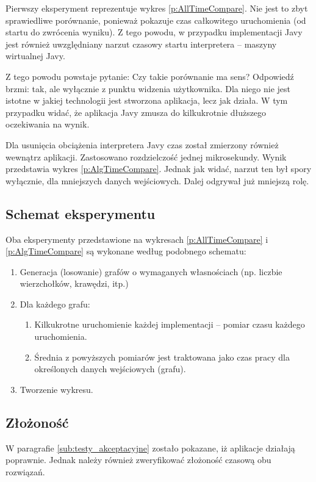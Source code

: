 Pierwszy eksperyment reprezentuje wykres \ref{p:AllTimeCompare}.
Nie jest to zbyt sprawiedliwe porównanie, ponieważ pokazuje czas całkowitego uruchomienia (od startu do zwrócenia wyniku).
Z tego powodu, w przypadku implementacji Javy jest również uwzględniany narzut czasowy startu interpretera -- maszyny wirtualnej Javy.

Z tego powodu powstaje pytanie: Czy takie porównanie ma sens? Odpowiedź brzmi: tak, ale wyłącznie z punktu widzenia użytkownika.
Dla niego nie jest istotne w jakiej technologii jest stworzona aplikacja, lecz jak działa.
W tym przypadku widać, że aplikacja Javy zmusza do kilkukrotnie dłuższego oczekiwania na wynik.

Dla usunięcia obciążenia interpretera Javy czas został zmierzony również wewnątrz aplikacji.
Zastosowano rozdzielczość jednej mikrosekundy. 
Wynik przedstawia wykres \ref{p:AlgTimeCompare}.
Jednak jak widać, narzut ten był spory wyłącznie, dla mniejszych danych wejściowych.
Dalej odgrywał już mniejszą rolę.

\subsection{Schemat eksperymentu}

Oba eksperymenty przedstawione na wykresach \ref{p:AllTimeCompare} i \ref{p:AlgTimeCompare}
są wykonane według podobnego schematu:

\begin{enumerate}
\item Generacja (losowanie) grafów o wymaganych własnościach (np. liczbie wierzchołków, krawędzi, itp.)
\item Dla każdego grafu:
	\begin{enumerate}
		\item Kilkukrotne uruchomienie każdej implementacji -- pomiar czasu każdego uruchomienia.
		\item Średnia z powyższych pomiarów jest traktowana jako czas pracy dla określonych danych wejściowych (grafu).	
	\end{enumerate}
\item Tworzenie wykresu.
\end{enumerate}


\subsection{Złożoność}

W paragrafie \ref{sub:testy_akceptacyjne} zostało pokazane, iż aplikacje działają poprawnie.
Jednak należy również zweryfikować złożoność czasową obu rozwiązań.

